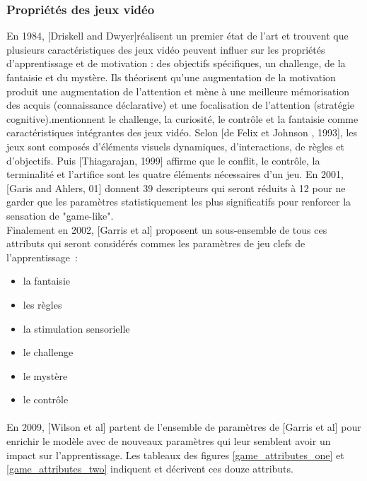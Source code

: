 		\subsubsection*{Propriétés des jeux vidéo}
En 1984, [Driskell and Dwyer]\cite{Dris84}réalisent un premier état de l'art et trouvent que plusieurs caractéristiques des jeux vidéo peuvent influer sur les propriétés d'apprentissage et de motivation : des objectifs spécifiques, un challenge, de la fantaisie et du mystère. Ils théorisent qu'une augmentation de la motivation produit une augmentation de l'attention et mène à une meilleure mémorisation des acquis (connaissance déclarative) et une focalisation de l'attention (stratégie cognitive). mentionnent le challenge, la curiosité, le contrôle et la fantaisie comme caractéristiques intégrantes des jeux vidéo. Selon [de Felix et Johnson , 1993], les jeux sont composés d'éléments visuels dynamiques, d'interactions, de règles et d'objectifs. Puis [Thiagarajan, 1999] affirme que le conflit, le contrôle, la terminalité et l'artifice sont les quatre éléments nécessaires d'un jeu. En 2001, [Garis and Ahlers, 01] donnent 39 descripteurs qui seront réduits à 12 pour ne garder que les paramètres statistiquement les plus significatifs pour renforcer la sensation de "game-like". \\ Finalement en 2002, [Garris et al] proposent un sous-ensemble de tous ces attributs qui seront considérés commes les paramètres de jeu clefs de l'apprentissage~:
\begin{itemize}
	\item la fantaisie
	\item les règles
	\item la stimulation sensorielle
	\item le challenge
	\item le mystère
	\item le contrôle
\end{itemize}

\paragraph{}En 2009, [Wilson et al]\cite{Wils09} partent de l'ensemble de paramètres de [Garris et al] pour enrichir le modèle avec de nouveaux paramètres qui leur semblent avoir un impact sur l'apprentissage.
Les tableaux des figures \ref{game_attributes_one} et \ref{game_attributes_two} indiquent et décrivent ces douze attributs.


